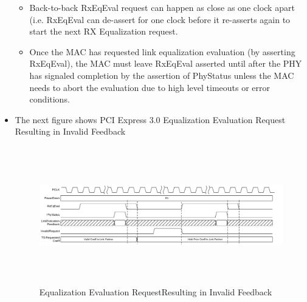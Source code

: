 \begin{itemize}
\begin{itemize}
    \item Back-to-back RxEqEval request can happen as close as one clock apart (i.e. RxEqEval can de-assert for one clock before it re-asserts again to start the next RX Equalization request.

    \item Once the MAC has requested link equalization evaluation (by asserting RxEqEval), the MAC must leave RxEqEval asserted until after the PHY has signaled completion by the assertion of PhyStatus unless the MAC needs to abort the evaluation due to high level timeouts or error conditions.

\end{itemize}

    \item The next figure shows PCI Express 3.0 Equalization Evaluation Request Resulting in Invalid Feedback
\begin{figure}[H]
  \centering
  \includegraphics[width=130mm,height=60mm]{images/clk_diagram/eq_v.png}
  \caption{Equalization Evaluation RequestResulting in Invalid Feedback}
  \label{lane}
\end{figure}

\end{itemize}
